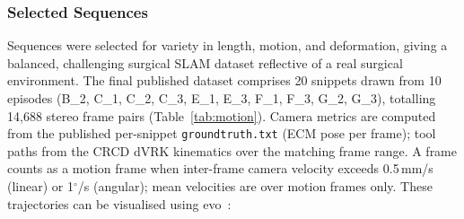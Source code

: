 \documentclass{article}
\begin{document}
\subsubsection{Selected Sequences}
Sequences were selected for variety in length, motion, and deformation, giving a balanced, challenging surgical SLAM dataset reflective of a real surgical environment. The final published dataset comprises 20 snippets drawn from 10 episodes (B\_2, C\_1, C\_2, C\_3, E\_1, E\_3, F\_1, F\_3, G\_2, G\_3), totalling 14{,}688 stereo frame pairs (Table~\ref{tab:motion}). Camera metrics are computed from the published per-snippet \texttt{groundtruth.txt} (ECM pose per frame); tool paths from the CRCD dVRK kinematics over the matching frame range. A frame counts as a motion frame when inter-frame camera velocity exceeds 0.5\,mm/s (linear) or 1$^\circ$/s (angular); mean velocities are over motion frames only. These trajectories can be visualised using evo~\cite{grupp2017evo}:
\end{document}
